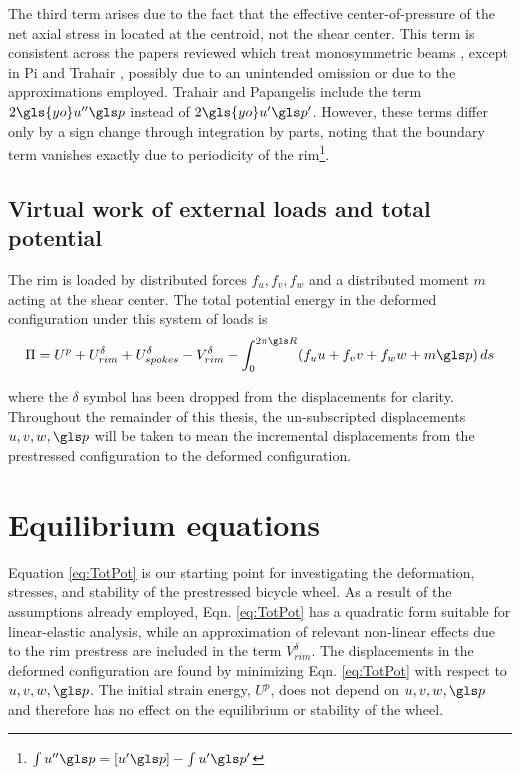 \documentclass[\rootdir/thesis.tex]{subfiles}
\begin{document}
The third term arises due to the fact that the effective center-of-pressure of the net axial stress in located at the centroid, not the shear center. This term is consistent across the papers reviewed which treat monosymmetric beams \cite{Pi1995,Pi1992,Ryu2012,Trahair1987}, except in Pi and Trahair \cite{Pi1992}, possibly due to an unintended omission or due to the approximations employed. Trahair and Papangelis \cite{Trahair1987} include the term $2\gls{yo}u''\p$ instead of $2\gls{yo}u'\p'$. However, these terms differ only by a sign change through integration by parts, noting that the boundary term vanishes exactly due to periodicity of the rim\footnote{$\int u''\p = [u'\p] - \int u'\p'$}.


\subsection{Virtual work of external loads and total potential}

The rim is loaded by distributed forces $f_u,f_v,f_w$ and a distributed moment $m$ acting at the shear center. The total potential energy in the deformed configuration under this system of loads is
\begin{equation}
\label{eq:TotPot}
\Pi = U^p + U_{rim}^{\delta} + U_{spokes}^{\delta} - V_{rim}^{\delta} - \int_0^{2\pi \R} (f_uu+f_vv+f_ww+m\p)\, ds
\end{equation}

where the $\delta$ symbol has been dropped from the displacements for clarity. Throughout the remainder of this thesis, the un-subscripted displacements $u,v,w,\p$ will be taken to mean the incremental displacements from the prestressed configuration to the deformed configuration.

\section{Equilibrium equations}

Equation \eqref{eq:TotPot} is our starting point for investigating the deformation, stresses, and stability of the prestressed bicycle wheel. As a result of the assumptions already employed, Eqn. \eqref{eq:TotPot} has a quadratic form suitable for linear-elastic analysis, while an approximation of relevant non-linear effects due to the rim prestress are included in the term $V_{rim}^{\delta}$. The displacements in the deformed configuration are found by minimizing Eqn. \eqref{eq:TotPot} with respect to $u,v,w,\p$. The initial strain energy, $U^p$, does not depend on $u,v,w,\p$ and therefore has no effect on the equilibrium or stability of the wheel.
\end{document}
